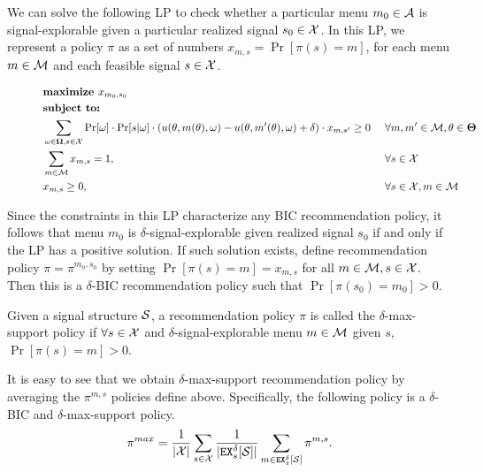 We can solve the following LP to check whether a particular menu $m_0 \in\A$ is signal-explorable given a particular realized signal $s_0\in\X$. In this LP, we represent a policy $\pi$ as a set of numbers
    $x_{m,s} = \Pr[\pi(s)=m]$,
for each menu $m\in \M$ and each feasible signal $s\in \X$.

\begin{figure}[H]
\begin{mdframed}
\begin{alignat*}{2}
 & \textbf{maximize }    x_{m_0,s_0}\  \\
&  \textbf{subject to: }\\
 & \sum_{\omega \in \varOmega, s \in \X} \Pr[\omega] \cdot \Pr[s | \omega] \cdot \left(u(\theta, m(\theta), \omega) - u(\theta, m'(\theta), \omega) + \delta\right) \cdot x_{m,s'} \geq 0  &\ & \forall m,m' \in \M, \theta \in \varTheta \\
                       & \sum_{m\in \M} x_{m,s} = 1,  \ &\ & \forall s \in \X \\
                       & x_{m,s} \geq 0,  \ &\ & \forall s \in \X, m\in \M \\
\end{alignat*}
\end{mdframed}
\label{fig:nocc_lp}
\end{figure}

Since the constraints in this LP characterize any BIC recommendation policy, it follows that menu $m_0$ is $\delta$-signal-explorable given realized signal $s_0$ if and only if the LP has a positive solution. If such solution exists, define recommendation policy $\pi = \pi^{m_0,s_0}$ by setting $\Pr[\pi(s) = m] = x_{m,s}$ for all $m \in \M, s \in \X$. Then this is a $\delta$-BIC recommendation policy such that $\Pr[\pi(s_0) = m_0] > 0$.

\begin{definition}
Given a signal structure $\S$, a recommendation policy $\pi$ is called the $\delta$-max-support policy if $\forall s \in \X$  and $\delta$-signal-explorable menu $m\in \M$ given $s$, $\Pr[\pi(s) = m] > 0$.
\end{definition}

It is easy to see that we obtain $\delta$-max-support recommendation policy by averaging the $\pi^{m,s}$ policies define above.
Specifically, the following policy is a $\delta$-BIC and $\delta$-max-support policy.
\begin{align}
\label{eq:pimax2}
\pi^{max} = \frac{1}{|\X|} \sum_{s \in \X} \frac{1}{|\EX_s^{\delta}[\S]|} \sum_{m \in \EX_s^{\delta}[\S]} \pi^{m,s}.
\end{align}

